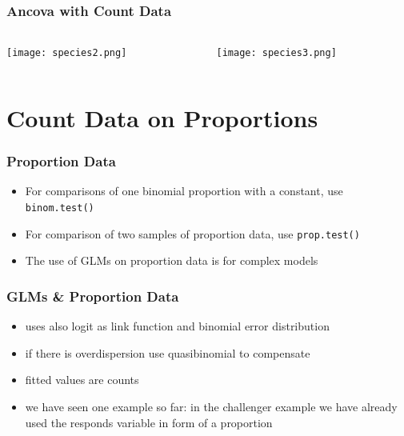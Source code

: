 \begin{frame}[fragile]\frametitle{Ancova with Count Data}
  \begin{columns}
    \begin{column}{0.5\textwidth}
\begin{center}
\texttt{[image: species2.png]}
\end{center}
    \end{column}
    \begin{column}{0.5\textwidth}
\begin{center}
\texttt{[image: species3.png]}
\end{center}
    \end{column}
  \end{columns}
\end{frame}

\section{Count Data on Proportions}
\begin{frame}[fragile]\frametitle{Proportion Data}
  \begin{itemize}
  \item For comparisons of one binomial proportion with a constant, use \texttt{binom.test()}
  \item For comparison of two samples of proportion data, use \texttt{prop.test()}
  \item The use of GLMs on proportion data is for complex models
  \end{itemize}
\end{frame}

\begin{frame}[fragile]\frametitle{GLMs \& Proportion Data}
  \begin{itemize}
  \item uses also logit as link function and binomial error distribution
  \item if there is overdispersion use quasibinomial to compensate
  \item fitted values are counts
  \item we have seen one example so far: in the challenger example we have already used the responds variable in form of a proportion
  \end{itemize}
\end{frame}

